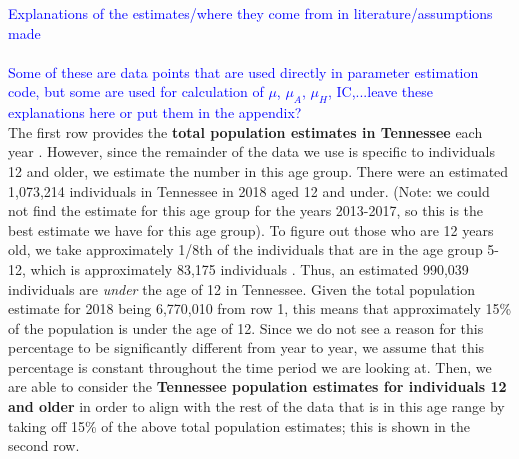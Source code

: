 \documentclass[12pt]{article}
\begin{document}
 \textcolor{blue}{Explanations of the estimates/where they come from in literature/assumptions made} \\ \\
 \textcolor{blue}{Some of these are data points that are used directly in parameter estimation code, but some are used for calculation of $\mu$, $\mu_A$, $\mu_H$, IC,...leave these explanations here or put them in the appendix?} \\
The first row provides the \textbf{total population estimates in Tennessee} each year \cite{USCensus}. However, since the remainder of the data we use is specific to individuals 12 and older, we estimate the number in this age group. 
There were an estimated 1,073,214 individuals in Tennessee in 2018 aged 12 and under. (Note: we could not find the estimate for this age group for the years 2013-2017, so this is the best estimate we have for this age group). To figure out those who are 12 years old, we take approximately 1/8th of the individuals that are in the age group 5-12, which is approximately 83,175 individuals \cite{DOHHS}. Thus, an estimated 990,039 individuals are \emph{under} the age of 12 in Tennessee. Given the total population estimate for 2018 being 6,770,010 from row 1, this means that approximately 15\% of the population is under the age of 12. Since we do not see a reason for this percentage to be significantly different from year to year, we assume that this percentage is constant throughout the time period we are looking at. Then, we are able to consider the \textbf{Tennessee population estimates for individuals 12 and older} in order to align with the rest of the data that is in this age range by taking off 15\% of the above total population estimates; this is shown in the second row.  \\
\end{document}
